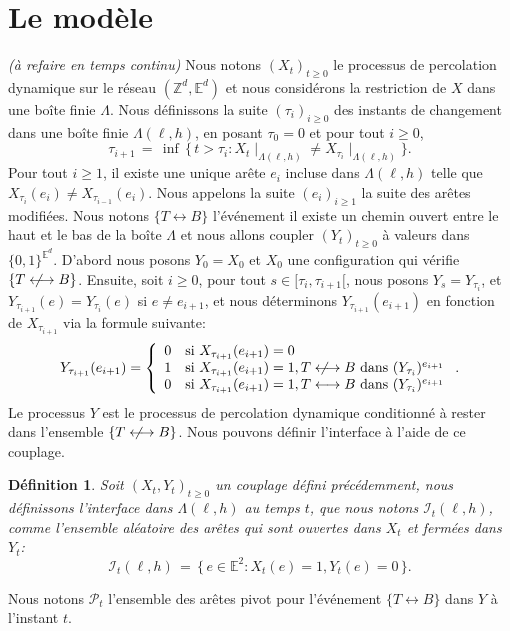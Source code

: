 \documentclass[titlepage,a4paper,12pt]{article}
\newcounter{def}
\newtheorem{defi}[def]{Définition}
\newcommand{\nlongleftrightarrow}{\longleftrightarrow \kern-15pt\not \kern15pt}
\begin{document}
\section{Le modèle}\emph{\color{blue}(à refaire en temps continu)}
Nous notons $(X_t)_{t\geqslant 0}$ le processus de percolation dynamique sur le réseau $(\mathbb{Z}^d,\mathbb{E}^d)$ et nous considérons la restriction de $X$ dans une boîte finie $\Lambda$. Nous définissons la suite $(\tau_i)_{i\geqslant 0}$ des instants de changement dans une boîte finie $\Lambda(\ell,h)$, en posant $\tau_0 = 0$ et pour tout $i\geqslant 0$,
$$\tau_{i+1} \,=\, \inf \,\big\{ \, t>\tau_i: {X_t}\mid_{ \Lambda(\ell,h)} \neq {X_{\tau_i}}\mid_{ \Lambda(\ell,h)} \big \}.
$$
Pour tout $i\geqslant 1$, il existe une unique arête $e_i$ incluse dans $\Lambda(\ell,h)$ telle que $X_{\tau_i}(e_i) \neq X_{\tau_{i-1}}(e_i)$. Nous appelons la suite $(e_i)_{i\geqslant 1}$ la suite des arêtes modifiées.
Nous notons $\{T\longleftrightarrow B\}$ l'événement il existe un chemin ouvert entre le haut et le bas de la boîte $\Lambda$ et nous allons coupler $(Y_t)_{t\geqslant 0}$ à valeurs dans $\{0,1\}^{\mathbb{E}^d}$. D'abord nous posons $Y_0=X_0$ et $X_0$ une configuration qui vérifie $\{T\nlongleftrightarrow B\}$. Ensuite, soit $i\geqslant 0$, pour tout $s\in [\tau_i, \tau_{i+1}[$, nous posons $Y_s = Y_{\tau_i}$, et $Y_{\tau_{i+1}}(e) =Y_{\tau_i}(e)$ si $e\neq e_{i+1}$, et nous déterminons $Y_{\tau_{i+1}}(e_{i+1})$ en fonction de $X_{\tau_{i+1}}$ via la formule suivante:
$$Y_{\tau_{i+1}}(e_{i+1})=\left\lbrace \begin{array}{cl}
0 &\text{si }X_{\tau_{i+1}}(e_{i+1}) = 0\\
1 & \text{si }X_{\tau_{i+1}}(e_{i+1}) = 1, T \nlongleftrightarrow B \text{ dans }(Y_{\tau_i})^{e_{i+1}}\\
0 & \text{si }X_{\tau_{i+1}}(e_{i+1}) = 1, T \longleftrightarrow B \text{ dans }(Y_{\tau_i})^{e_{i+1}}
\end{array}\right..$$
Le processus $Y$ est le processus de percolation dynamique conditionné à rester dans l'ensemble $\{T\nlongleftrightarrow B\}$. Nous pouvons définir l'interface à l'aide de ce couplage.
\begin{defi}
Soit $(X_t,Y_t)_{t\geqslant 0}$ un couplage défini précédemment, nous définissons l'interface dans $\Lambda({\ell,h})$ au temps $t$, que nous notons $\mathcal{I}_t({\ell,h})$, comme l'ensemble aléatoire des arêtes qui sont ouvertes dans $X_t$ et fermées dans $Y_t$: $$ \mathcal{I}_t({\ell,h}) \,=\, \big\{ \,e\in \mathbb{E}^2: X_t(e) = 1, Y_t(e) = 0 \, \big\}.
$$
\end{defi}
Nous notons $\mathcal{P}_t$ l'ensemble des arêtes pivot pour l'événement $\{T\longleftrightarrow B\}$ dans $Y$ à l'instant $t$.
\end{document}
